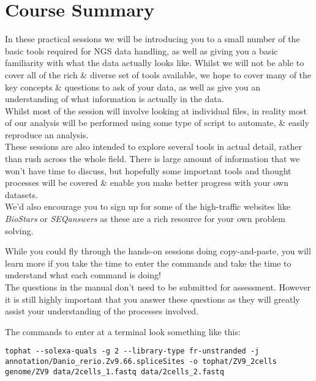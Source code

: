 %
%
\newpage

\section{Course Summary}
In these practical sessions we will be introducing you to a small number of the basic tools required for NGS data handling, as well as giving you a basic familiarity with what the data actually looks like.
Whilst we will not be able to cover all of the rich \& diverse set of tools available, we hope to cover many of the key concepts \& questions to ask of your data, as well as give you an understanding of what information is actually in the data.\\

Whilst most of the session will involve looking at individual files, in reality most of our analysis will be performed using some type of script to automate, \& easily reproduce an analysis. \\

These sessions are also intended to explore several tools in actual detail, rather than rush across the whole field.
There is large amount of information that we won't have time to discuss, but hopefully some important tools and thought processes will be covered \& enable you make better progress with your own datasets.\\

We'd also encourage you to sign up for some of the high-traffic websites like \textit{BioStars} or \textit{SEQanswers} as these are a rich resource for your own problem solving.\\


\begin{warning}
While you could fly through the hands-on sessions doing copy-and-paste, you will learn more if you take the time to enter the commands and take the time to understand what each command is doing! \\

The questions in the manual don't need to be submitted for assessment.
However it is still highly important that you answer these questions as they will greatly assist your understanding of the processes involved.
\end{warning}

The commands to enter at a terminal look something like this:
\begin{lstlisting}
tophat --solexa-quals -g 2 --library-type fr-unstranded -j annotation/Danio_rerio.Zv9.66.spliceSites -o tophat/ZV9_2cells genome/ZV9 data/2cells_1.fastq data/2cells_2.fastq
\end{lstlisting}  

